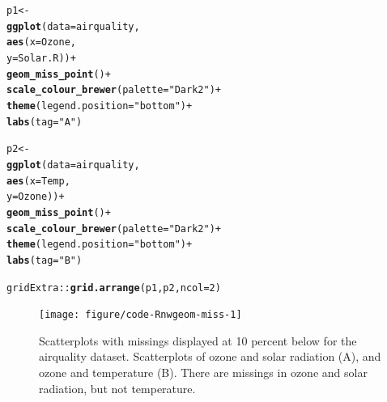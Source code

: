 \documentclass{article}\usepackage[]{graphicx}\usepackage[]{xcolor}
\makeatletter
\newcommand{\hlnum}[1]{\textcolor[rgb]{0.686,0.059,0.569}{#1}}%
\newcommand{\hlstr}[1]{\textcolor[rgb]{0.192,0.494,0.8}{#1}}%
\newcommand{\hlopt}[1]{\textcolor[rgb]{0,0,0}{#1}}%
\newcommand{\hlstd}[1]{\textcolor[rgb]{0.345,0.345,0.345}{#1}}%
\newcommand{\hlkwb}[1]{\textcolor[rgb]{0.69,0.353,0.396}{#1}}%
\newcommand{\hlkwc}[1]{\textcolor[rgb]{0.333,0.667,0.333}{#1}}%
\newcommand{\hlkwd}[1]{\textcolor[rgb]{0.737,0.353,0.396}{\textbf{#1}}}%
\newenvironment{kframe}{%
 \def\at@end@of@kframe{}%
 \ifinner\ifhmode%
  \def\at@end@of@kframe{\end{minipage}}%
  \begin{minipage}{\columnwidth}%
 \fi\fi%
 \def\FrameCommand##1{\hskip\@totalleftmargin \hskip-\fboxsep
 \colorbox{shadecolor}{##1}\hskip-\fboxsep
     \hskip-\linewidth \hskip-\@totalleftmargin \hskip\columnwidth}%
 \MakeFramed {\advance\hsize-\width
   \@totalleftmargin\z@ \linewidth\hsize
   \@setminipage}}%
 {\par\unskip\endMakeFramed%
 \at@end@of@kframe}
\newenvironment{knitrout}{}{} %
\makeatother
\begin{document}
\begin{knitrout}
\color{fgcolor}\begin{kframe}
\begin{alltt}
\hlstd{p1} \hlkwb{<-}
\hlkwd{ggplot}\hlstd{(}\hlkwc{data} \hlstd{= airquality,}
       \hlkwd{aes}\hlstd{(}\hlkwc{x} \hlstd{= Ozone,}
           \hlkwc{y} \hlstd{= Solar.R))} \hlopt{+}
  \hlkwd{geom_miss_point}\hlstd{()} \hlopt{+}
  \hlkwd{scale_colour_brewer}\hlstd{(}\hlkwc{palette} \hlstd{=} \hlstr{"Dark2"}\hlstd{)} \hlopt{+}
  \hlkwd{theme}\hlstd{(}\hlkwc{legend.position} \hlstd{=} \hlstr{"bottom"}\hlstd{)} \hlopt{+}
  \hlkwd{labs}\hlstd{(}\hlkwc{tag} \hlstd{=} \hlstr{"A"}\hlstd{)}

\hlstd{p2} \hlkwb{<-}
\hlkwd{ggplot}\hlstd{(}\hlkwc{data} \hlstd{= airquality,}
       \hlkwd{aes}\hlstd{(}\hlkwc{x} \hlstd{= Temp,}
           \hlkwc{y} \hlstd{= Ozone))} \hlopt{+}
  \hlkwd{geom_miss_point}\hlstd{()} \hlopt{+}
  \hlkwd{scale_colour_brewer}\hlstd{(}\hlkwc{palette} \hlstd{=} \hlstr{"Dark2"}\hlstd{)} \hlopt{+}
  \hlkwd{theme}\hlstd{(}\hlkwc{legend.position} \hlstd{=} \hlstr{"bottom"}\hlstd{)}  \hlopt{+}
  \hlkwd{labs}\hlstd{(}\hlkwc{tag} \hlstd{=} \hlstr{"B"}\hlstd{)}

\hlstd{gridExtra}\hlopt{::}\hlkwd{grid.arrange}\hlstd{(p1, p2,} \hlkwc{ncol} \hlstd{=} \hlnum{2}\hlstd{)}
\end{alltt}
\end{kframe}\begin{figure}

{\centering \texttt{[image: figure/code-Rnwgeom-miss-1]} 

}

\caption[Scatterplots with missings displayed at 10 percent below for the airquality dataset]{Scatterplots with missings displayed at 10 percent below for the airquality dataset. Scatterplots of ozone and solar radiation (A), and ozone and temperature (B). There are missings in ozone and solar radiation, but not temperature.}\label{fig:geom-miss}
\end{figure}

\end{knitrout}
\end{document}
